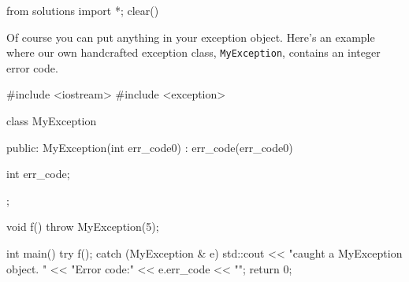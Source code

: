 \begin{python0}
from solutions import *; clear()
\end{python0}

Of course you can put anything in your exception object.
Here's an example where our own handcrafted exception
class, \texttt{MyException}, contains an integer error code.

\begin{console}
#include <iostream>
#include <exception>

class MyException
{
public:
        MyException(int err_code0)
        : err_code(err_code0)
        {}
        
        int err_code;
};

void f()
{    
     throw MyException(5);
}

int main()
{   
    try
    {   
        f();
    }
    catch (MyException & e)
    {     
          std::cout << "caught a MyException object. "
                    << "Error code:" << e.err_code
                    << "\n";
    }
    return 0;
}
\end{console}


